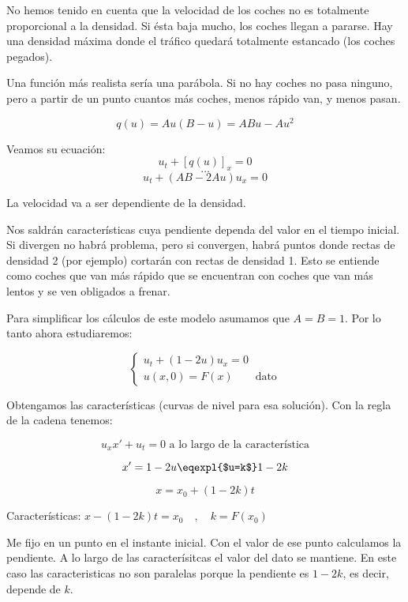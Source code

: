 		No hemos tenido en cuenta que la velocidad de los coches no es totalmente proporcional a la densidad. Si ésta baja mucho, los coches llegan a pararse. Hay una densidad máxima donde el tráfico quedará totalmente estancado (los coches pegados).

		\begin{figure}[hbtp]
			\centering
			\caption{}
			\label{fig:parabola}
		\end{figure}

		Una función más realista sería una parábola. Si no hay coches no pasa ninguno, pero a partir de un punto cuantos más coches, menos rápido van, y menos pasan.

		$$ q(u) = Au (B-u) = ABu - Au^{2} $$

		Veamos su ecuación:
		$$u_t + [q(u)]_x = 0$$
		$$ … $$
		$$ u_t + (AB - 2Au) u_x = 0 $$

		La velocidad va a ser dependiente de la densidad.

		Nos saldrán características cuya pendiente dependa del valor en el tiempo inicial. Si divergen no habrá problema, pero si convergen, habrá puntos donde rectas de densidad 2 (por ejemplo) cortarán con rectas de densidad 1. Esto se entiende como coches que van más rápido que se encuentran con coches que van más lentos y se ven obligados a frenar.


		Para simplificar los cálculos de este modelo asumamos que $A = B = 1$. Por lo tanto ahora estudiaremos:

		\begin{equation*}
		\left\{
		\begin{array}{l}
		u_t + (1-2u)u_{x} = 0 \\
		u(x, 0) = F(x) \quad \quad \text{dato}
		\end{array}
		\right.
		\end{equation*}

		Obtengamos las características (curvas de nivel para esa solución). Con la regla de la cadena tenemos:

		$$u_x x' + u_t = 0 \text{ a lo largo de la característica}$$

		$$x' = 1 - 2u \eqexpl{$u=k$} 1 - 2k$$

		$$x = x_0 + (1-2k)t$$

		Características:
		\( x - (1-2k)t = x_0\quad,\quad k=F(x_0)  \label{eq:caracteristicas_realistas} \)

		Me fijo en un punto en el instante inicial. Con el valor de ese punto calculamos la pendiente. A lo largo de las caracterísitcas el valor del dato se mantiene. En este caso las caracteristicas no son paralelas porque la pendiente es $1-2k$, es decir, depende de $k$.

